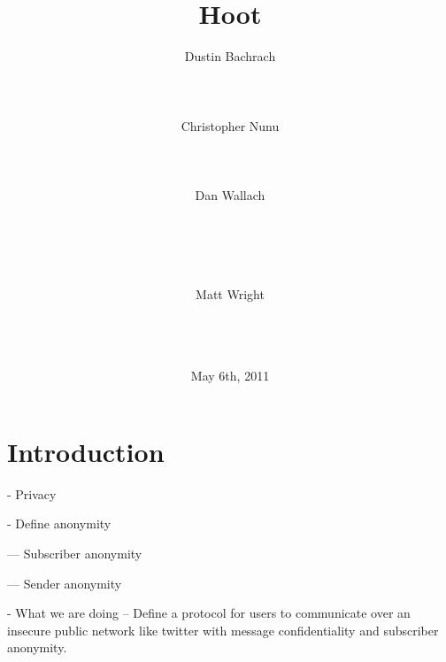 \documentclass{acm_proc_article-sp}
\begin{document}

\author{
\alignauthor
	Dustin Bachrach\\
	\\
	\\
	\\
\alignauthor
 	Christopher Nunu\\
	\\
	\\
	\\
\alignauthor
	Dan Wallach\\
	\\
	\\
	\\
	\\
\and
\alignauthor
	Matt Wright\\
	\\
	\\
	\\
}

\title{Hoot}
\date{May 6th, 2011}

\maketitle

\begin{abstract}

\end{abstract}

\section{Introduction}

- Privacy

- Define anonymity

--- Subscriber anonymity

--- Sender anonymity

- What we are doing
-- Define a protocol for users to communicate over an insecure public network like twitter with message confidentiality and subscriber anonymity. 
\end{document}
